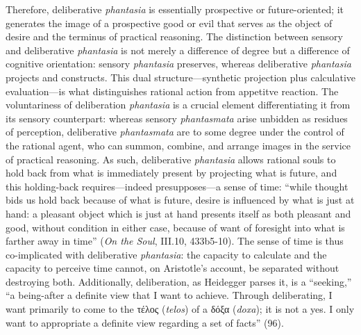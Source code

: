 \documentclass{article}
\newcommand{\gk}[1]{{\greekfont #1}}
\begin{document}
Therefore, deliberative \textit{phantasia} is essentially prospective or future-oriented; it generates the image of a prospective good or evil that serves as the object of desire and the terminus of practical reasoning. The distinction between sensory and deliberative \textit{phantasia} is not merely a difference of degree but a difference of cognitive orientation: sensory \textit{phantasia} preserves, whereas deliberative \textit{phantasia} projects and constructs. This dual structure---synthetic projection plus calculative evaluation---is what distinguishes rational action from appetitve reaction. The voluntariness of deliberation \textit{phantasia} is a crucial element differentiating it from its sensory counterpart: whereas sensory \textit{phantasmata} arise unbidden as residues of perception, deliberative \textit{phantasmata} are to some degree under the control of the rational agent, who can summon, combine, and arrange images in the service of practical reasoning. As such, deliberative \textit{phantasia} allows rational souls to hold back from what is immediately present by projecting what is future, and this holding-back requires---indeed presupposes---a sense of time: ``while thought bids us hold back because of what is future, desire is influenced by what is just at hand: a pleasant object which is just at hand presents itself as both pleasant and good, without condition in either case, because of want of foresight into what is farther away in time'' (\textit{On the Soul}, III.10, 433b5-10). The sense of time is thus co-implicated with deliberative \textit{phantasia}: the capacity to calculate and the capacity to perceive time cannot, on Aristotle's account, be separated without destroying both. Additionally, deliberation, as Heidegger parses it, is a ``seeking,'' ``a being-after a definite view that I want to achieve. Through deliberating, I want primarily to come to the \gk{τέλος} (\textit{telos}) of a \gk{δόξα} (\textit{doxa}); it is not a yes. I only want to appropriate a definite view regarding a set of facts'' (96). 
\end{document}
